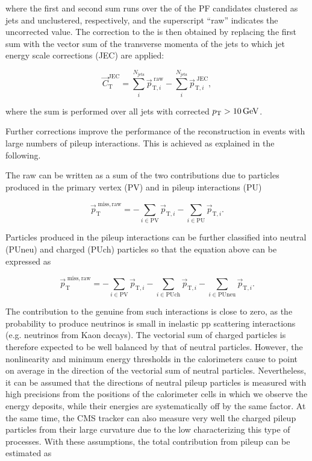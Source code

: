 where the first and second sum runs over the \pt of the PF candidates clustered as jets and unclustered, respectively, and the superscript ``raw'' indicates the uncorrected value.
The correction to the \ptvecmiss is then obtained by replacing the first sum with the vector sum of the transverse momenta of the jets to which jet energy scale corrections (JEC) are applied:

\begin{equation}
{\vec C}_\mathrm{T}^\mathrm{JEC} = \sum_{i}^{N_\mathrm{jets}} {\vec p}_{\mathrm{T},i}^{\;\mathrm{raw}} - \sum_{i}^{N_\mathrm{jets}} {\vec p}_{\mathrm{T},i}^{\;\mathrm{JEC}},
\end{equation}

where the sum is performed over all jets with corrected $p_{\mathrm{T}} > 10\,\text{Ge\hspace{-.08em}V}$.

Further corrections improve the performance of the \ptvecmiss reconstruction in events with large numbers of pileup interactions. This is achieved as explained in the following.

The raw \ptvecmiss can be written as a sum of the two contributions due to particles produced in the primary vertex (PV) and in pileup interactions (PU)

\begin{equation}\label{eqn:metraw}
{\vec p}_\mathrm{T}^\mathrm{\; miss,raw} = - \sum_{i \in \mathrm{PV}} {\vec p}_{\mathrm{T},i} - \sum_{i \in \mathrm{PU}} {\vec p}_{\mathrm{T},i}.
\end{equation}

Particles produced in the pileup interactions can be further classified into neutral (PUneu) and charged (PUch) particles so that the equation above can be expressed as

\begin{equation}
{\vec p}_\mathrm{T}^\mathrm{\; miss,raw} = - \sum_{i \in \mathrm{PV}} {\vec p}_{\mathrm{T},i} - \sum_{i \in \mathrm{PUch}} {\vec p}_{\mathrm{T},i} - \sum_{i \in \mathrm{PUneu}} {\vec p}_{\mathrm{T},i}.
\end{equation}

The contribution to the genuine \ptvecmiss from such interactions is close to zero, as the probability to produce neutrinos is small in inelastic pp scattering interactions (e.g. neutrinos from Kaon decays).
The vectorial \Vpt sum of charged particles is therefore expected to be well balanced by that of neutral particles.
However, the nonlinearity and minimum energy thresholds in the calorimeters cause \ptvecmiss to point on average in the direction of the vectorial \Vpt sum of neutral particles.
Nevertheless, it can be assumed that the directions of neutral pileup particles is measured with high precisions from the positions of the calorimeter cells in which we observe the energy deposits, while their energies are systematically off by the same factor. At the same time, the CMS tracker can also measure very well the charged pileup particles from their large curvature due to the low \pt characterizing this type of processes.
With these assumptions, the total contribution from pileup can be estimated as

